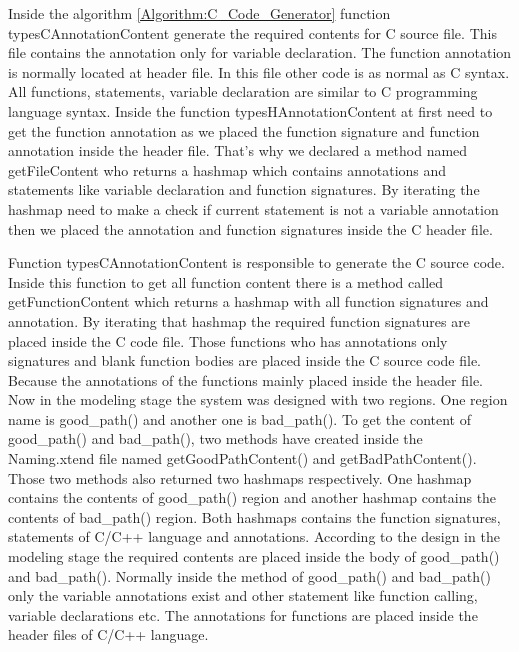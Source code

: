 Inside the algorithm \ref{Algorithm:C_Code_Generator} function typesCAnnotationContent generate the required contents for C source file. This file contains the annotation only for variable declaration. The function annotation is normally located at header file. In this file other code is as normal as C syntax. All functions, statements, variable declaration are similar to C programming language syntax. Inside the function typesHAnnotationContent at first need to get the function annotation as we placed the function signature and function annotation inside the header file. That's why we declared a method named getFileContent who returns a hashmap which contains annotations and statements like variable declaration and function signatures. By iterating the hashmap need to make a check if current statement is not a variable annotation then we placed the annotation and function signatures inside the C header file.

Function typesCAnnotationContent is responsible to generate the C source code. Inside this function to get all function content there is a method called getFunctionContent which returns a hashmap with all function signatures and annotation. By iterating that hashmap the required function signatures are placed inside the C code file. Those functions who has annotations only signatures and blank function bodies are placed inside the C source code file. Because the annotations of the functions mainly placed inside the header file. Now in the modeling stage the system was designed with two regions. One region name is good\_path() and another one is bad\_path(). To get the content of good\_path() and bad\_path(), two methods have created inside the Naming.xtend file named getGoodPathContent() and getBadPathContent(). Those two methods also returned two hashmaps respectively. One hashmap contains the contents of good\_path() region and another hashmap contains the contents of bad\_path() region. Both hashmaps contains the function signatures, statements of C/C++ language and annotations. According to the design in the modeling stage the required contents are placed inside the body of good\_path() and bad\_path(). Normally inside the method of good\_path() and bad\_path() only the variable annotations exist and other statement like function calling, variable declarations etc. The annotations for functions are placed inside the header files of C/C++ language. 

